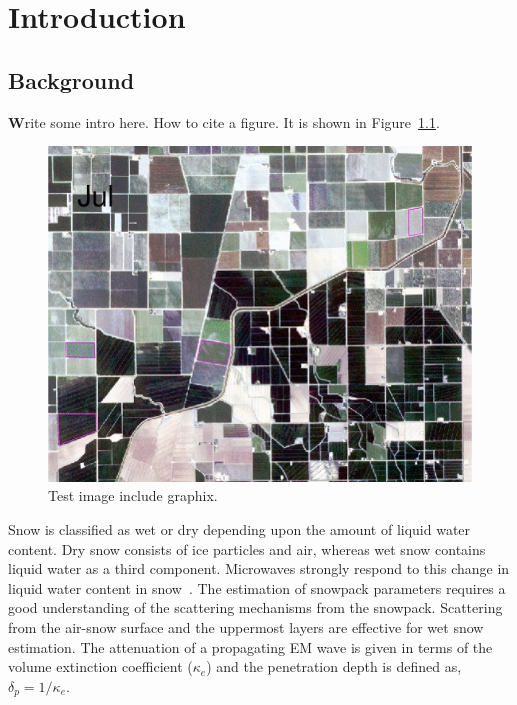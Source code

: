 \chapter{Introduction}
\section{Background}

\label{sec:background}

\lettrine[findent=2pt]{\textbf{W}}{}rite some intro here. How to cite a figure. It is shown in Figure~\ref{fig:testimage}.
\begin{figure}[!h]
	\centering
	\includegraphics[width=1.0\textwidth]{Figures/testimage.jpg}
	\hspace{1mm}
	\caption{Test image include graphix.} 
	\label{fig:testimage}
\end{figure}

Snow is classified as wet or dry depending upon the amount of liquid water content. Dry snow consists of ice particles and air, whereas wet snow contains liquid water as a third component. Microwaves strongly respond to this change in liquid water content in snow~\citep{hallikainen1986dielectric}. The estimation of snowpack parameters requires a good understanding of the scattering mechanisms from the snowpack. Scattering from the air-snow surface and the uppermost layers are effective for wet snow estimation. The attenuation of a propagating EM wave is given in terms of the volume extinction coefficient ($\kappa_e$) and the penetration depth is defined as, $\delta_{p}=1/\kappa_e$. 




